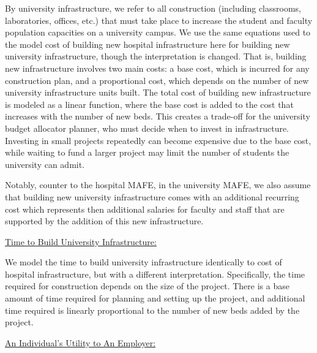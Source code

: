 By university infrastructure, we refer to all construction (including classrooms, laboratories, offices, etc.) that must take place to increase the student and faculty population capacities on a university campus. We use the same equations used to the model cost of building new hospital infrastructure here for building new university infrastructure, though the interpretation is changed. That is, building new infrastructure involves two main costs: a base cost, which is incurred for any construction plan, and a proportional cost, which depends on the number of new university infrastructure units built. The total cost of building new infrastructure is modeled as a linear function, where the base cost is added to the cost that increases with the number of new beds. This creates a trade-off for the university budget allocator planner, who must decide when to invest in infrastructure. Investing in small projects repeatedly can become expensive due to the base cost, while waiting to fund a larger project may limit the number of students the university can admit.

Notably, counter to the hospital MAFE, in the university MAFE, we also assume that building new university infrastructure comes with an additional recurring cost which represents then additional salaries for faculty and staff that are supported by the addition of this new infrastructure. 


\underline{Time to Build University Infrastructure:}

We model the time to build university infrastructure identically to cost of hospital infrastructure, but with a different interpretation. Specifically, the time required for construction depends on the size of the project. There is a base amount of time required for planning and setting up the project, and additional time required is linearly proportional to the number of new beds added by the project.

\underline{An Individual's Utility to An Employer:}

